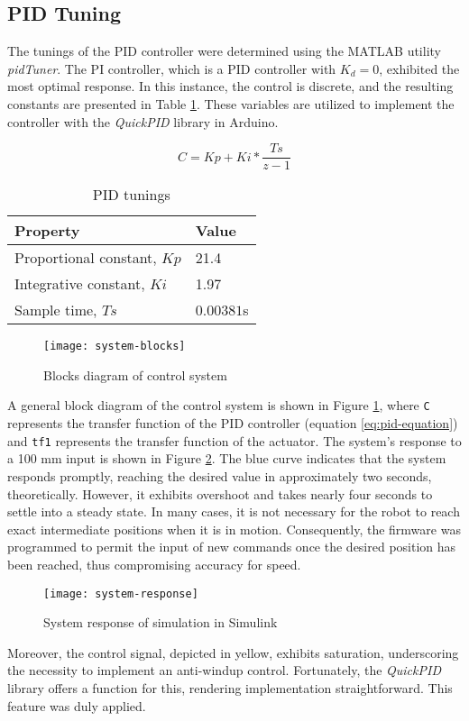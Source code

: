 \subsection{PID Tuning}

The tunings of the PID controller were determined using the MATLAB utility \textit{pidTuner}. The PI controller, which is a PID controller with $K_d = 0$, exhibited the most optimal response. In this instance, the control is discrete, and the resulting constants are presented in Table \ref{tab:pid-tunings}. These variables are utilized to implement the controller with the \textit{QuickPID} library in Arduino.

\begin{equation}
    \label{eq:pid-equation}
    C = Kp + Ki * \frac{Ts}{z-1}
\end{equation}

\begin{table}[h]
    \centering
    \caption{PID tunings}
    \label{tab:pid-tunings}
    \begin{tabular}{ll}
    \toprule
    Property & Value \\
    \midrule
    Proportional constant, $Kp$  & 21.4 \\
    Integrative constant, $Ki$ & 1.97 \\
    Sample time, $Ts$ & $0.00381$s \\
    \bottomrule
    \end{tabular}
\end{table}

\begin{figure}[H]
    \centering
    \texttt{[image: system-blocks]}
    \caption{Blocks diagram of control system}
    \label{fig:system-blocks}
\end{figure}

A general block diagram of the control system is shown in Figure \ref{fig:system-blocks}, where \texttt{C} represents the transfer function of the PID controller (equation \ref{eq:pid-equation}) and \texttt{tf1} represents the transfer function of the actuator. The system's response to a 100 mm input is shown in Figure \ref{fig:system-response}. The blue curve indicates that the system responds promptly, reaching the desired value in approximately two seconds, theoretically. However, it exhibits overshoot and takes nearly four seconds to settle into a steady state. In many cases, it is not necessary for the robot to reach exact intermediate positions when it is in motion. Consequently, the firmware was programmed to permit the input of new commands once the desired position has been reached, thus compromising accuracy for speed.

\begin{figure}[H]
    \centering
    \texttt{[image: system-response]}
    \caption{System response of simulation in Simulink}
    \label{fig:system-response}
\end{figure}

Moreover, the control signal, depicted in yellow, exhibits saturation, underscoring the necessity to implement an anti-windup control. Fortunately, the \textit{QuickPID} library offers a function for this, rendering implementation straightforward. This feature was duly applied.
